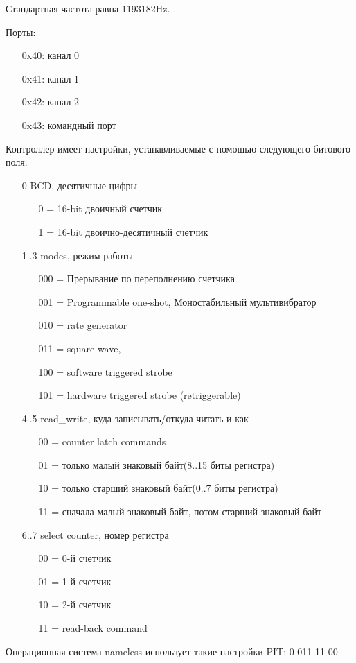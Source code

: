 \documentclass[12pt]{article}
\begin{document}
	Стандартная частота равна 1193182Hz.

	Порты:
		\begin{enumerate}[leftmargin=2\parindent]
			\item[0x40:]{канал 0}
			\item[0x41:]{канал 1}
			\item[0x42:]{канал 2}
			\item[0x43:]{командный порт}
		\end{enumerate}

	Контроллер имеет настройки, устанавливаемые с помощью следующего битового поля:
		\begin{enumerate}[leftmargin=2\parindent]
			\item[0]{BCD, десятичные цифры}
				\begin{enumerate}
					\item[0 =]{16-bit двоичный счетчик}
					\item[1 =]{16-bit двоично-десятичный счетчик}
				\end{enumerate}
			\item[1..3]{modes, режим работы}
				\begin{enumerate}
					\item[000 =]{Прерывание по переполнению счетчика}
					\item[001 =]{Programmable one-shot, Моностабильный мультивибратор}
					\item[010 =]{rate generator}
					\item[011 =]{square wave, }
					\item[100 =]{software triggered strobe}
					\item[101 =]{hardware triggered strobe (retriggerable)}
				\end{enumerate}
			\item[4..5]{read\_write, куда записывать/откуда читать и как}
				\begin{enumerate}
					\item[00 =]{counter latch commands}
					\item[01 =]{только малый знаковый байт(8..15 биты регистра)}
					\item[10 =]{только старший знаковый байт(0..7 биты регистра)}
					\item[11 =]{сначала малый знаковый байт, потом старший знаковый байт}
				\end{enumerate}
			\item[6..7]{select counter, номер регистра}
				\begin{enumerate}
					\item[00 =]{0-й счетчик}
					\item[01 =]{1-й счетчик}
					\item[10 =]{2-й счетчик}
					\item[11 =]{read-back command}
				\end{enumerate}
		\end{enumerate}
	Операционная система nameless использует такие настройки PIT: 0 011 11 00
\end{document}
